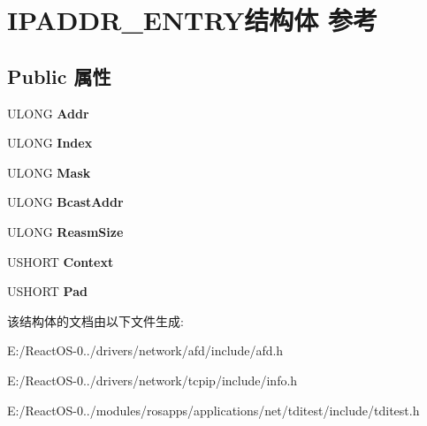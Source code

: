 \hypertarget{struct_i_p_a_d_d_r___e_n_t_r_y}{}\section{I\+P\+A\+D\+D\+R\+\_\+\+E\+N\+T\+R\+Y结构体 参考}
\label{struct_i_p_a_d_d_r___e_n_t_r_y}
\subsection*{Public 属性}
\begin{DoxyCompactItemize}
\item 
\mbox{\label{struct_i_p_a_d_d_r___e_n_t_r_y_a724c608d80da3c775bd910fc308d2f31}} 
U\+L\+O\+NG {\bfseries Addr}
\item 
\mbox{\label{struct_i_p_a_d_d_r___e_n_t_r_y_a8f815984e59a192037b3890529b030d9}} 
U\+L\+O\+NG {\bfseries Index}
\item 
\mbox{\label{struct_i_p_a_d_d_r___e_n_t_r_y_a450e63c429de4b268e7e1d6dbbf67133}} 
U\+L\+O\+NG {\bfseries Mask}
\item 
\mbox{\label{struct_i_p_a_d_d_r___e_n_t_r_y_a18216e36102e2db7a661e9fc3fc1b02a}} 
U\+L\+O\+NG {\bfseries Bcast\+Addr}
\item 
\mbox{\label{struct_i_p_a_d_d_r___e_n_t_r_y_a5a05438f9f1394990fb93b6d7ee0a84c}} 
U\+L\+O\+NG {\bfseries Reasm\+Size}
\item 
\mbox{\label{struct_i_p_a_d_d_r___e_n_t_r_y_a552a8e53420f5fabfd94d704631e027c}} 
U\+S\+H\+O\+RT {\bfseries Context}
\item 
\mbox{\label{struct_i_p_a_d_d_r___e_n_t_r_y_a6d18da4ee5c9b413d81e40216dba5a46}} 
U\+S\+H\+O\+RT {\bfseries Pad}
\end{DoxyCompactItemize}


该结构体的文档由以下文件生成\+:\begin{DoxyCompactItemize}
\item 
E\+:/\+React\+O\+S-\/0../drivers/network/afd/include/afd.\+h\item 
E\+:/\+React\+O\+S-\/0../drivers/network/tcpip/include/info.\+h\item 
E\+:/\+React\+O\+S-\/0../modules/rosapps/applications/net/tditest/include/tditest.\+h\end{DoxyCompactItemize}
